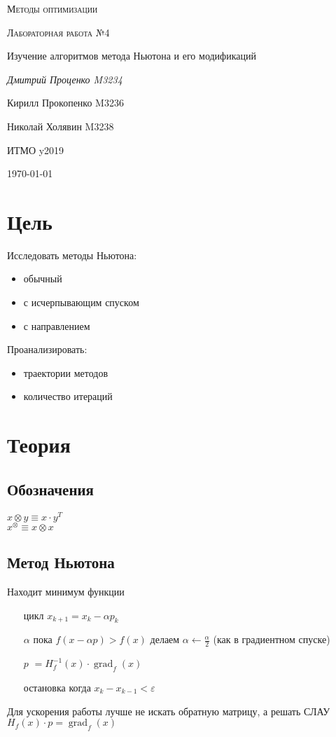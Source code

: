 \documentclass[russian, english]{article}
\begin{document}
\begin{titlepage}
\centering
	{\scshape\LARGE Методы оптимизации \par}
	\vspace{1cm}
	{\scshape\Large Лабораторная работа №4\par Изучение алгоритмов метода Ньютона и его модификаций\par}
	\vspace{2cm}
	{\Large\itshape Дмитрий Проценко M3234 \par
	Кирилл Прокопенко M3236 \par
	Николай Холявин M3238 \par}
	\vfill
	ИТМО y2019
	\vfill
	{\large \today\par}
\end{titlepage}

\tableofcontents
\newpage

\section{Цель}
Исследовать методы Ньютона:
\begin{itemize}
	\item обычный
	\item с исчерпывающим спуском
	\item с направлением
\end{itemize}
Проанализировать:
\begin{itemize}
	\item траектории методов
	\item количество итераций
\end{itemize}

\section{Теория}
\subsection{Обозначения}
$x\otimes y\equiv x\cdot y^T$\\
$x^\otimes \equiv x\otimes x$\\
\subsection{Метод Ньютона}
Находит минимум функции
\begin{itemize}
	\item[цикл] $x_{k+1} = x_{k} - \alpha p_{k}$
	\item[$\alpha$] пока $f(x - \alpha p) > f(x)$ делаем $\alpha\leftarrow \frac{\alpha}{2}$ (как в градиентном спуске)
	\item[$p$] $= H_f^{-1}(x)\cdot\operatorname{grad}_f(x)$
	\item[остановка] когда $x_k - x_{k - 1} < \varepsilon$
\end{itemize}
Для ускорения работы лучше не искать обратную матрицу, а решать СЛАУ $H_f(x)\cdot p=\operatorname{grad}_f(x)$
\end{document}
